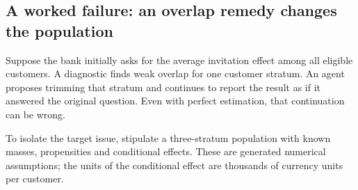 \hypertarget{a-worked-failure-an-overlap-remedy-changes-the-population}{%
\subsection{A worked failure: an overlap remedy changes the
population}\label{a-worked-failure-an-overlap-remedy-changes-the-population}}

Suppose the bank initially asks for the average invitation effect among
all eligible customers. A diagnostic finds weak overlap for one customer
stratum. An agent proposes trimming that stratum and continues to report
the result as if it answered the original question. Even with perfect
estimation, that continuation can be wrong.

To isolate the target issue, stipulate a three-stratum population with
known masses, propensities and conditional effects. These are generated
numerical assumptions; the units of the conditional effect are thousands
of currency units per customer.

